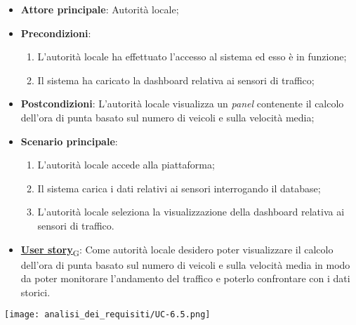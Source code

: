 \begin{itemize}
	\item \textbf{Attore principale}: Autorità locale;
	\item \textbf{Precondizioni}:
	      \begin{enumerate}
		      \item L'autorità locale ha effettuato l'accesso al sistema ed esso è in funzione;
		      \item Il sistema ha caricato la dashboard relativa ai sensori di traffico;
	      \end{enumerate}
	\item \textbf{Postcondizioni}: L'autorità locale visualizza un \textit{panel} contenente il calcolo dell'ora di punta basato sul numero di veicoli e sulla velocità media;
	\item \textbf{Scenario principale}:
	      \begin{enumerate}
		      \item L'autorità locale accede alla piattaforma;
		      \item Il sistema carica i dati relativi ai sensori interrogando il database;
		      \item L'autorità locale seleziona la visualizzazione della dashboard relativa ai sensori di traffico.
	      \end{enumerate}
	\item \href{https://7last.github.io/docs/rtb/documentazione-interna/glossario\#user-story}{\textbf{User story}\textsubscript{G}}:
	      Come autorità locale desidero poter visualizzare il calcolo dell'ora di punta basato sul numero di veicoli e sulla velocità media in modo da poter monitorare
	      l'andamento del traffico e poterlo confrontare con i dati storici.
\end{itemize}
\begin{center}
	\texttt{[image: analisi\_dei\_requisiti/UC-6.5.png]}
\end{center}


